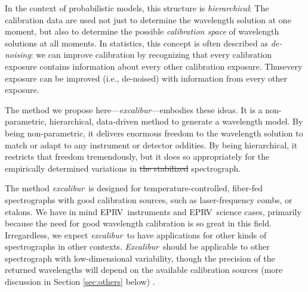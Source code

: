 \documentclass[twocolumn,table,xcolor,trackchanges]{aastex63} %
\newcommand{\project}[1]{\textsl{#1}}
\newcommand{\name}{\project{excalibur}}
\newcommand{\Name}{\project{Excalibur}}
\newcommand{\acronym}[1]{{\small{#1}}}
\newcommand{\eprv}{\acronym{EPRV}}
\providecommand{\DIFadd}[1]{{\protect\color{blue}\uwave{#1}}} %
\providecommand{\DIFdel}[1]{{\protect\color{red}\sout{#1}}}                      %
\providecommand{\DIFaddbegin}{} %
\providecommand{\DIFaddend}{} %
\providecommand{\DIFdelbegin}{} %
\providecommand{\DIFdelend}{} %
\begin{document}
In the context of probabilistic models, this structure is \emph{hierarchical}:  The calibration data are used not just to determine the wavelength solution at one moment, but also to determine the possible \emph{calibration space} of wavelength solutions at all moments.  In statistics, this concept is often described as \emph{de-noising}:  we can improve calibration by recognizing that every calibration exposure contains information about every other calibration exposure.  Thus\DIFaddbegin \DIFadd{, }\DIFaddend every exposure can be improved (i.e., de-noised) with information from every other exposure.

The method we propose here---\name---embodies these ideas.
It is a non-parametric, hierarchical, data-driven method to generate a wavelength model.  By being non-parametric, it delivers enormous freedom to the wavelength solution to match or adapt to any instrument or detector oddities.  By being hierarchical, it restricts that freedom tremendously, but it does so appropriately for the empirically determined variations in \DIFdelbegin \DIFdel{the stabilized }\DIFdelend \DIFaddbegin \DIFadd{a }\DIFaddend spectrograph.

The method \name\ is designed for temperature-controlled, fiber-fed spectrographs with good calibration sources, such as laser-frequency combs, or etalons.  We have in mind \eprv\ instruments and \eprv\ science cases, primarily because the need for good wavelength calibration is so great in this field.  Irregardless, we expect \name\ to have applications for other kinds of spectrographs in other contexts.  \Name\ should be applicable to other spectrograph with low-dimensional variability, though the precision of the returned wavelengths will depend on the available calibration sources (more discussion in Section \ref{sec:others} below) .
\end{document}
